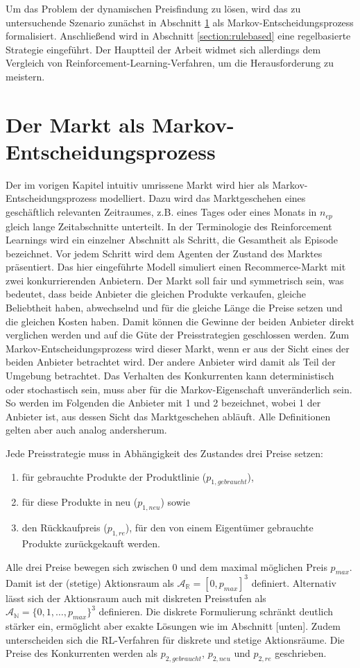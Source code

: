Um das Problem der dynamischen Preisfindung zu lösen, wird das zu untersuchende Szenario zunächst in Abschnitt \ref{section:markov} als Markov-Entscheidungsprozess formalisiert.
Anschließend wird in Abschnitt \ref{section:rulebased} eine regelbasierte Strategie eingeführt.
Der Hauptteil der Arbeit widmet sich allerdings dem Vergleich von Reinforcement-Learning-Verfahren, um die Herausforderung zu meistern.

\section{Der Markt als Markov-Entscheidungsprozess}
\label{section:markov}
Der im vorigen Kapitel intuitiv umrissene Markt wird hier als Markov-Entscheidungsprozess modelliert.
Dazu wird das Marktgeschehen eines geschäftlich relevanten Zeitraumes, z.B. eines Tages oder eines Monats in $n_{ep}$ gleich lange Zeitabschnitte unterteilt.
In der Terminologie des Reinforcement Learnings wird ein einzelner Abschnitt als Schritt, die Gesamtheit als Episode bezeichnet.
Vor jedem Schritt wird dem Agenten der Zustand des Marktes präsentiert.
Das hier eingeführte Modell simuliert einen Recommerce-Markt mit zwei konkurrierenden Anbietern.
Der Markt soll fair und symmetrisch sein, was bedeutet, dass beide Anbieter die gleichen Produkte verkaufen, gleiche Beliebtheit haben, abwechselnd und für die gleiche Länge die Preise setzen und die gleichen Kosten haben.
Damit können die Gewinne der beiden Anbieter direkt verglichen werden und auf die Güte der Preisstrategien geschlossen werden.
Zum Markov-Entscheidungsprozess wird dieser Markt, wenn er aus der Sicht eines der beiden Anbieter betrachtet wird.
Der andere Anbieter wird damit als Teil der Umgebung betrachtet.
Das Verhalten des Konkurrenten kann deterministisch oder stochastisch sein, muss aber für die Markov-Eigenschaft unveränderlich sein.
So werden im Folgenden die Anbieter mit 1 und 2 bezeichnet, wobei 1 der Anbieter ist, aus dessen Sicht das Marktgeschehen abläuft.
Alle Definitionen gelten aber auch analog andersherum.

Jede Preisstrategie muss in Abhängigkeit des Zustandes drei Preise setzen:
\begin{enumerate}
	\item für gebrauchte Produkte der Produktlinie ($p_{1, gebraucht}$),
	\item für diese Produkte in neu ($p_{1, neu}$) sowie
	\item den Rückkaufpreis ($p_{1, re}$), für den von einem Eigentümer gebrauchte Produkte zurückgekauft werden.
\end{enumerate}
Alle drei Preise bewegen sich zwischen 0 und dem maximal möglichen Preis $p_{max}$.
Damit ist der (stetige) Aktionsraum als $\mathcal{A}_\mathbb{R}=[0, p_{max}]^3$ definiert.
Alternativ lässt sich der Aktionsraum auch mit diskreten Preisstufen als $\mathcal{A}_\mathbb{N}=\{0, 1, \ldots, p_{max}\}^3$ definieren.
Die diskrete Formulierung schränkt deutlich stärker ein, ermöglicht aber exakte Lösungen wie im Abschnitt [unten].
Zudem unterscheiden sich die RL-Verfahren für diskrete und stetige Aktionsräume.
Die Preise des Konkurrenten werden als $p_{2, gebraucht}$, $p_{2, neu}$ und $p_{2, re}$ geschrieben.

